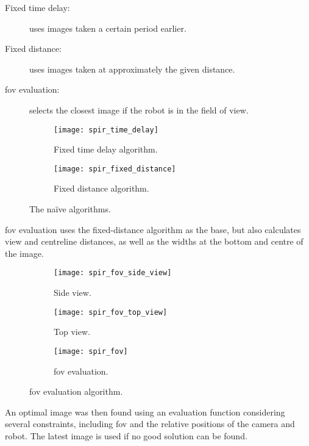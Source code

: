 \begin{description}
  \item [Fixed time delay:] uses images taken a certain period earlier.
  \item [Fixed distance:] uses images taken at approximately the given distance.
  \item [\Gls{fov} evaluation:] selects the closest image if the robot is in the field of view.
\end{description}

\begin{figure}[h]
  \centering
  \begin{subfigure}[b]{0.45\textwidth}
    \texttt{[image: spir\_time\_delay]}
    \caption{Fixed time delay algorithm.}
    \label{fig:spir_time_delay}
  \end{subfigure}
  \hfill
  \begin{subfigure}[b]{0.45\textwidth}
    \texttt{[image: spir\_fixed\_distance]}
    \caption{Fixed distance algorithm.}
    \label{fig:spir_fixed_distance}
  \end{subfigure}
  \caption{The naïve algorithms.\cite{shiroma2004}}
  \label{fig:spir_naive_algorithms}
\end{figure}

\Gls{fov} evaluation uses the fixed-distance algorithm as the base, but also calculates view and centreline distances, as well as the widths at the bottom and centre of the image.

\begin{figure}[h]
  \centering
  \begin{subfigure}[b]{0.3\textwidth}
    \texttt{[image: spir\_fov\_side\_view]}
    \caption{Side view.}
    \label{fig:spir_fov_side_view}
  \end{subfigure}
  \hfill
  \begin{subfigure}[b]{0.3\textwidth}
    \texttt{[image: spir\_fov\_top\_view]}
    \caption{Top view.}
    \label{fig:spir_fov_top_view}
  \end{subfigure}
  \hfill
  \begin{subfigure}[b]{0.3\textwidth}
    \texttt{[image: spir\_fov]}
    \caption{\Gls{fov} evaluation.}
    \label{fig:spir_fov_flowchart}
  \end{subfigure}
  \caption{\Gls{fov} evaluation algorithm.\cite{shiroma2004}}
  \label{fig:spir_fov}
\end{figure}

An optimal image was then found using an evaluation function considering several constraints, including \gls{fov} and the relative positions of the camera and robot.
The latest image is used if no good solution can be found.

